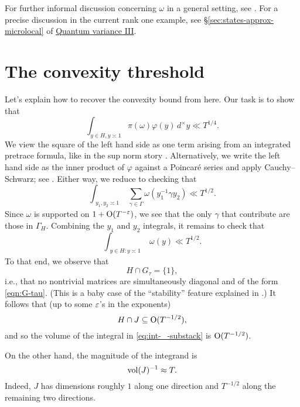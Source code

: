 \documentclass[reqno]{amsart} 
\numberwithin{equation}{section}
\numberwithin{theorem}{section}
\begin{document}
For further informal discussion concerning $\omega$ in a general setting, see \cite[\S2]{2020arXiv201202187N}.  For a precise discussion in the current rank one example, see \S\ref{sec:states-approx-microlocal} of \href{var-quat-3-submitted.pdf}{Quantum variance III}.


\section{The convexity threshold}\label{sec:org82a14f5}
Let's explain how to recover the convexity bound from here.  Our task is to show that
\begin{equation*}
  \int _{y \in H, y \asymp 1} \pi(\omega) \varphi(y) \, d^\times y \ll T^{1/4}.
\end{equation*}
We view the square of the left hand side as one term arising from an integrated pretrace formula, like in the sup norm story \cite{iwan-sar}.  Alternatively, we write the left hand side as the inner product of $\varphi$ against a Poincar{\'e} series and apply Cauchy--Schwarz; see \cite[\S5.3]{2020arXiv201202187N}.  Either way, we reduce to checking that
\begin{equation}\label{eq:int-_-substack-1}
  \int _{
    \substack{
      y_1, y_2 \asymp 1
    }
  }
  \sum _{\gamma \in \Gamma }
  \omega (y_1^{-1} \gamma y_2)
  \ll
  T^{1/2}.
\end{equation}
Since $\omega$ is supported on $1 + \operatorname{O}(T^{-\varepsilon})$, we see that the only $\gamma$ that contribute are those in $\Gamma_{H}$.  Combining the $y_1$ and $y_2$ integrals, it remains to check that
\begin{equation}\label{eq:int-_-substack}
  \int _{
    \substack{
      y \in H : y\asymp 1
    }
  }
  \omega (y)
  \ll
  T^{1/2}.
\end{equation}
To that end, we observe that
\begin{equation*}
  H \cap G_\tau = \{1\},
\end{equation*}
i.e., that no nontrivial matrices are simultaneously diagonal and of the form \eqref{eqn:G-tau}.  (This is a baby case of the ``stability'' feature explained in \cite[\S1.9, \S14]{nelson-venkatesh-1}.)  It follows that (up to some $\varepsilon$'s in the exponents)
\begin{equation*}
  H \cap J \subseteq \operatorname{O}(T^{-1/2}),
\end{equation*}
and so the volume of the integral in  \eqref{eq:int-_-substack} is $\operatorname{O}(T^{-1/2})$.

On the other hand, the magnitude of the integrand is
\begin{equation*}
  \operatorname{vol}(J)^{-1} \approx T.
\end{equation*}
Indeed, $J$ has dimensions roughly $1$ along one direction and $T^{-1/2}$ along the remaining two directions.
\end{document}
